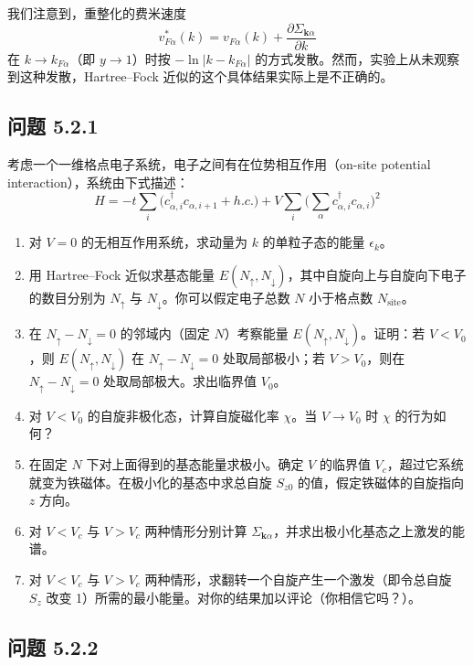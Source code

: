我们注意到，重整化的费米速度
\begin{equation*}
v^{*}_{F\alpha}(k) = v_{F\alpha}(k) + \frac{\partial \Sigma_{\pmb{k}\alpha}}{\partial k}
\end{equation*}
在 $k \to k_{F\alpha}$（即 $y \to 1$）时按 $-\ln|k - k_{F\alpha}|$ 的方式发散。然而，实验上从未观察到这种发散，Hartree--Fock 近似的这个具体结果实际上是不正确的。

\subsection*{问题 5.2.1}

考虑一个一维格点电子系统，电子之间有在位势相互作用（on-site potential interaction），系统由下式描述：
\begin{equation*}
H = -t \sum_{i} \big( c^{\dagger}_{\alpha,i} c_{\alpha,i+1} + h.c. \big) + V \sum_{i} \Big( \sum_{\alpha} c^{\dagger}_{\alpha,i} c_{\alpha,i} \Big)^{2}
\end{equation*}

\begin{enumerate}
\item 对 $V=0$ 的无相互作用系统，求动量为 $k$ 的单粒子态的能量 $\epsilon_k$。
\item 用 Hartree--Fock 近似求基态能量 $E(N_{\uparrow}, N_{\downarrow})$，其中自旋向上与自旋向下电子的数目分别为 $N_{\uparrow}$ 与 $N_{\downarrow}$。你可以假定电子总数 $N$ 小于格点数 $N_{\mathrm{site}}$。
\item 在 $N_{\uparrow}-N_{\downarrow}=0$ 的邻域内（固定 $N$）考察能量 $E(N_{\uparrow}, N_{\downarrow})$。证明：若 $V<V_0$，则 $E(N_{\uparrow}, N_{\downarrow})$ 在 $N_{\uparrow}-N_{\downarrow}=0$ 处取局部极小；若 $V>V_0$，则在 $N_{\uparrow}-N_{\downarrow}=0$ 处取局部极大。求出临界值 $V_0$。
\item 对 $V<V_0$ 的自旋非极化态，计算自旋磁化率 $\chi$。当 $V\to V_0$ 时 $\chi$ 的行为如何？
\item 在固定 $N$ 下对上面得到的基态能量求极小。确定 $V$ 的临界值 $V_c$，超过它系统就变为铁磁体。在极小化的基态中求总自旋 $S_{z0}$ 的值，假定铁磁体的自旋指向 $z$ 方向。
\item 对 $V<V_c$ 与 $V>V_c$ 两种情形分别计算 $\Sigma_{\pmb{k}\alpha}$，并求出极小化基态之上激发的能谱。
\item 对 $V<V_c$ 与 $V>V_c$ 两种情形，求翻转一个自旋产生一个激发（即令总自旋 $S_z$ 改变 1）所需的最小能量。对你的结果加以评论（你相信它吗？）。
\end{enumerate}

\subsection*{问题 5.2.2}

